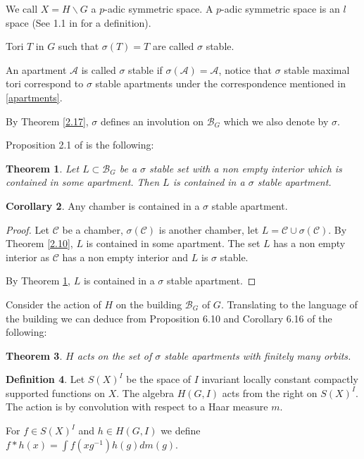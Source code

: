 \documentclass[12pt]{article}
\newcommand{\A}{\mathcal{A}}
\newcommand{\B}{\mathcal{B}}
\newcommand{\C}{\mathcal{C}}
\newcommand{\<}{\langle}
\renewcommand{\>}{\rangle}
\theoremstyle{plain}
\newtheorem{theorem}{Theorem}[section] %
\theoremstyle{definition}
\newtheorem{cor}[theorem]{Corollary}
\newtheorem{defn}[theorem]{Definition} %
\begin{document}
We call $X=H\backslash G$ a $p$-adic symmetric space. A $p$-adic symmetric space is an $l$ space (See 1.1 in \cite{Bernshtein1976REPRESENTATIONSOT} for a definition).

Tori $T$ in $G$ such that $\sigma(T)=T$ are called $\sigma$ stable.

An apartment $\A$ is called $\sigma$ stable if $\sigma(\A)=\A$, notice that $\sigma$ stable maximal tori correspond to $\sigma$ stable apartments under the correspondence mentioned in \ref{apartments}.

By Theorem \ref{2.17}, $\sigma$ defines an involution on $\B_G$ which we also denote by $\sigma$.

Proposition 2.1 of \cite{delorm} is the following:

\begin{theorem}\label{2.22}
Let $L\subset\B_G$ be a $\sigma$ stable set with a non empty interior which is contained in some apartment. Then $L$ is contained in a $\sigma$ stable apartment.
\end{theorem}

\begin{cor}\label{2.23}
Any chamber is contained in a $\sigma$ stable apartment.
\end{cor}

\begin{proof}
Let $\C$ be a chamber, $\sigma(\C)$ is another chamber, let $L=\C\cup\sigma(\C)$. By Theorem \ref{2.10}, $L$ is contained in some apartment. The set $L$ has a non empty interior as $\C$ has a non empty interior and $L$ is $\sigma$ stable.

By Theorem \ref{2.22}, $L$ is contained in a $\sigma$ stable apartment. 
\end{proof}


Consider the action of $H$ on the building $\B_G$ of $G$.
Translating to the language of the building we can deduce from Proposition 6.10 and Corollary 6.16 of \cite{Helminck} the following:

\begin{theorem}\label{Fin_Sig_Apart}
 $H$ acts on the set of $\sigma$ stable apartments with finitely many orbits.
\end{theorem}

\begin{defn}\label{convolution action}
    Let $S(X)^I$ be the space of $I$ invariant locally constant compactly supported functions on $X$. The algebra $H(G,I)$ acts from the right on $S(X)^I$. The action is by convolution with respect to a Haar measure $m$.

    For $f\in S(X)^I$ and $h\in H(G,I)$ we define $f*h(x)=\int f(xg^{-1})h(g)dm(g)$.
\end{defn}
\end{document}
